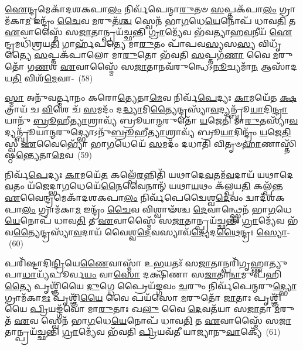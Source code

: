 {\anuvakamend[{\-\ul{𑌰𑍁}\-𑌦𑍍𑌰𑍋 𑌭𑍇᳴\-\ul{𑌷}\-𑌜𑌂 \ul{𑌵𑌿}\-𑌨𑍍𑌦\-\ul{𑌤𑍇} 𑌯𑌦𑌿᳴ 𑌸𑍍𑌤𑍃\-\ul{𑌣𑍀}\-𑌯𑌾\-\ul{𑌦}\-𑌰𑍍𑌦𑍍𑌧𑌂 𑌦𑍍𑌵𑌾𑌦᳴𑌶 𑌚}]}

\-\ul{𑌐}\-𑌨𑍍𑌦𑍍𑌰𑌮𑍇𑌕𑌾᳴\-𑌦𑌶\-𑌕𑌪𑌾\-\ul{𑌲𑌂} 𑌨𑌿𑌰𑍍𑌵᳴𑌪𑍇𑌨𑍍𑌮𑌾\-\ul{𑌰𑍁}\-𑌤𑍞 \ul{𑌸}\-𑌪𑍍𑌤𑌕᳴𑌪𑌾\-\ul{𑌲𑌂} 𑌗𑍍𑌰𑌾𑌮᳴𑌕𑌾\-\ul{𑌮} 𑌇𑌨𑍍𑌦𑍍𑌰𑌂᳴ \ul{𑌚𑍈}\-𑌵 \ul{𑌮}\-𑌰𑍁𑌤᳴\-\ul{𑌶𑍍𑌚} 𑌸𑍍𑌵𑍇𑌨᳴ 𑌭𑌾\-\ul{𑌗}\-𑌧𑍇\-\ul{𑌯𑍇}\-𑌨𑍋𑌪᳴ 𑌧𑌾𑌵\-\ul{𑌤𑌿} 𑌤 \ul{𑌏}\-𑌵𑌾𑌸𑍍𑌮𑍈᳴ 𑌸\-\ul{𑌜𑌾}\-𑌤𑌾𑌨𑍍𑌪𑍍𑌰𑌯᳴𑌚𑍍𑌛𑌨𑍍𑌤𑌿 \ul{𑌗𑍍𑌰𑌾}\-𑌮𑍍𑌯𑍇᳴𑌵 𑌭᳴𑌵𑌤𑍍𑌯𑌾𑌹\-\ul{𑌵}\-𑌨𑍀𑌯᳴ \ul{𑌐}\-𑌨𑍍𑌦𑍍𑌰𑌮𑌧𑌿᳴𑌶𑍍𑌰𑌯\-\ul{𑌤𑌿} 𑌗𑌾𑌰𑍍\mbox{}𑌹᳴𑌪𑌤𑍍𑌯𑍇 𑌮𑌾\-\ul{𑌰𑍁}\-𑌤𑌂 𑌪𑌾᳴𑌪𑌵\-\ul{𑌸𑍍𑌯}\-𑌸\-\ul{𑌸𑍍𑌯} 𑌵𑌿𑌧𑍃᳴𑌤𑍍𑌯𑍈 \ul{𑌸}\-𑌪𑍍𑌤𑌕᳴𑌪𑌾𑌲𑍋 𑌮𑌾\-\ul{𑌰𑍁}\-𑌤𑍋 𑌭᳴𑌵𑌤𑌿 \ul{𑌸}\-𑌪𑍍𑌤𑌗᳴\-\ul{𑌣𑌾} 𑌵𑍈 \ul{𑌮}\-𑌰𑍁𑌤𑍋᳴ 𑌗\-\ul{𑌣}\-𑌶 \ul{𑌏}\-𑌵𑌾𑌸𑍍𑌮𑍈᳴ 𑌸\-\ul{𑌜𑌾}\-𑌤𑌾𑌨𑌵᳴\-𑌰𑍁𑌨𑍍𑌧𑍇\-𑌽\-\ul{𑌨𑍂}\-𑌚𑍍𑌯𑌮𑌾᳴\-\ul{𑌨} 𑌆𑌸𑌾᳴𑌦𑌯\-\ul{𑌤𑌿} 𑌵𑌿𑌶᳴\-\ul{𑌮𑍇}\-𑌵𑌾-~(58)

\-\ul{𑌸𑍍𑌮𑌾} 𑌅𑌨𑍁᳴𑌵𑌰𑍍𑌤𑍍𑌮𑌾𑌨𑌂 𑌕𑌰𑍋\-\ul{𑌤𑍍𑌯𑍇}\-𑌤𑌾\-\ul{𑌮𑍇}\-𑌵 𑌨𑌿𑌰𑍍𑌵᳴\-\ul{𑌪𑍇}\-𑌦𑍍𑌯𑌃 \ul{𑌕𑌾}\-𑌮𑌯𑍇᳴𑌤 \ul{𑌕𑍍𑌷}\-𑌤𑍍𑌰𑌾𑌯᳴ 𑌚 \ul{𑌵𑌿}\-𑌶𑍇 𑌚᳴ \ul{𑌸}\-𑌮𑌦𑌂᳴ 𑌦\-\ul{𑌦𑍍𑌧𑍍𑌯𑌾}\-𑌮𑌿\-\ul{𑌤𑍍𑌯𑍈}\-𑌨𑍍𑌦𑍍𑌰𑌸𑍍𑌯𑌾᳴\-\ul{𑌵}\-𑌦𑍍𑌯𑌨𑍍𑌬𑍍𑌰𑍂᳴\-\ul{𑌯𑌾}\-𑌦𑌿\-\ul{𑌨𑍍𑌦𑍍𑌰𑌾}\-𑌯𑌾𑌨𑍁᳴ \ul{𑌬𑍍𑌰𑍂}\-𑌹𑍀\-\ul{𑌤𑍍𑌯𑌾}\-𑌶𑍍𑌰𑌾𑌵𑍍𑌯᳴ 𑌬𑍍𑌰𑍂𑌯𑌾\-\ul{𑌨𑍍𑌮}\-𑌰𑍁𑌤𑍋᳴ \ul{𑌯}\-𑌜𑍇𑌤𑌿᳴ 𑌮𑌾\-\ul{𑌰𑍁}\-𑌤𑌸𑍍𑌯𑌾᳴\-\ul{𑌵}\-𑌦𑍍𑌯𑌨𑍍𑌬𑍍𑌰𑍂᳴𑌯𑌾\-\ul{𑌨𑍍𑌮}\-𑌰𑍁𑌦𑍍𑌭𑍍𑌯𑍋\-𑌽𑌨𑍁᳴\-\ul{𑌬𑍍𑌰𑍂}\-𑌹𑍀\-\ul{𑌤𑍍𑌯𑌾}\-𑌶𑍍𑌰𑌾𑌵𑍍𑌯᳴ 𑌬𑍍𑌰𑍂\-\ul{𑌯𑌾}\-𑌦𑌿𑌨𑍍𑌦𑍍𑌰𑌂᳴ \ul{𑌯}\-𑌜𑍇\-\ul{𑌤𑌿} 𑌸𑍍𑌵 \ul{𑌏}\-𑌵𑍈𑌭𑍍𑌯𑍋᳴ 𑌭𑌾\-\ul{𑌗}\-𑌧𑍇𑌯𑍇᳴ \ul{𑌸}\-𑌮𑌦𑌂᳴ 𑌦𑌧𑌾𑌤𑌿 𑌵𑌿𑌤𑍃𑍞\-\ul{𑌹𑌾}\-𑌣𑌾𑌸𑍍𑌤𑌿᳴𑌷𑍍𑌠\-\ul{𑌨𑍍𑌤𑍍𑌯𑍇}\-𑌤𑌾\-\ul{𑌮𑍇}\-𑌵~(59)

𑌨𑌿𑌰𑍍𑌵᳴\-\ul{𑌪𑍇}\-𑌦𑍍𑌯𑌃 \ul{𑌕𑌾}\-𑌮𑌯𑍇᳴\-\ul{𑌤} 𑌕𑌲𑍍𑌪𑍇᳴\-\ul{𑌰}\-𑌨𑍍𑌨𑌿𑌤𑌿᳴ 𑌯𑌥𑌾𑌦𑍇\-\ul{𑌵}\-𑌤𑌮᳴\-\ul{𑌵}\-𑌦𑌾𑌯᳴ 𑌯𑌥𑌾𑌦𑍇\-\ul{𑌵}\-𑌤𑌂 𑌯᳴𑌜𑍇𑌦𑍍𑌭𑌾\-\ul{𑌗}\-𑌧𑍇𑌯𑍇᳴\-\ul{𑌨𑍈}\-𑌵𑍈𑌨𑌾𑌨𑍍᳴ 𑌯𑌥𑌾\-\ul{𑌯}\-𑌥𑌂 𑌕᳴𑌲𑍍𑌪𑌯\-\ul{𑌤𑌿} 𑌕𑌲𑍍𑌪᳴𑌨𑍍𑌤 \ul{𑌏}\-𑌵𑍈𑌨𑍍𑌦𑍍𑌰𑌮𑍇𑌕𑌾᳴\-𑌦𑌶\-𑌕𑌪𑌾\-\ul{𑌲𑌂} 𑌨𑌿𑌰𑍍𑌵᳴𑌪𑍇𑌦𑍍𑌵𑍈𑌶𑍍𑌵\-\ul{𑌦𑍇}\-𑌵𑌂 𑌦𑍍𑌵𑌾𑌦᳴𑌶\-𑌕𑌪𑌾\-\ul{𑌲𑌂} 𑌗𑍍𑌰𑌾𑌮᳴𑌕𑌾\-\ul{𑌮} 𑌇𑌨𑍍𑌦𑍍𑌰𑌂᳴ \ul{𑌚𑍈}\-𑌵 𑌵𑌿𑌶𑍍𑌵𑌾𑍟᳴𑌶𑍍𑌚 \ul{𑌦𑍇}\-𑌵𑌾𑌨𑍍𑌥𑍍𑌸𑍍𑌵𑍇𑌨᳴ 𑌭𑌾\-\ul{𑌗}\-𑌧𑍇\-\ul{𑌯𑍇}\-𑌨𑍋𑌪᳴ 𑌧𑌾𑌵\-\ul{𑌤𑌿} 𑌤 \ul{𑌏}\-𑌵𑌾𑌸𑍍𑌮𑍈᳴ 𑌸\-\ul{𑌜𑌾}\-𑌤𑌾𑌨𑍍𑌪𑍍𑌰𑌯᳴𑌚𑍍𑌛𑌨𑍍𑌤𑌿 \ul{𑌗𑍍𑌰𑌾}\-𑌮𑍍𑌯𑍇᳴𑌵 𑌭᳴𑌵\-\ul{𑌤𑍍𑌯𑍈}\-𑌨𑍍𑌦𑍍𑌰𑌸𑍍𑌯𑌾᳴\-\ul{𑌵}\-𑌦𑌾𑌯᳴ 𑌵𑍈𑌶𑍍𑌵\-\ul{𑌦𑍇}\-𑌵𑌸𑍍𑌯𑌾𑌵᳴\-\ul{𑌦𑍍𑌯𑍇}\-𑌦\-\ul{𑌥𑍈}\-𑌨𑍍𑌦𑍍𑌰𑌃 \ul{𑌸𑍍𑌯𑍋}\--~(60)

𑌪𑌰𑌿᳴𑌷𑍍𑌟𑌾𑌦𑌿\-\ul{𑌨𑍍𑌦𑍍𑌰𑌿}\-𑌯𑍇\-\ul{𑌣𑍈}\-𑌵𑌾𑌸𑍍𑌮𑌾᳴ 𑌉\-\ul{𑌭}\-𑌯𑌤𑌃᳴ 𑌸\-\ul{𑌜𑌾}\-𑌤𑌾𑌨𑍍𑌪𑌰𑌿᳴\-𑌗𑍃𑌹𑍍𑌣𑌾𑌤𑍍𑌯𑍁𑌪𑌾\-\ul{𑌧𑌾}\-𑌯𑍍𑌯᳴𑌪𑍂𑌰𑍍𑌵\-\ul{𑌯𑌂} 𑌵𑌾\-\ul{𑌸𑍋} 𑌦𑌕𑍍𑌷𑌿᳴𑌣𑌾 𑌸\-\ul{𑌜𑌾}\-𑌤𑌾\-\ul{𑌨𑌾}\-𑌮𑍁𑌪᳴𑌹𑌿\-\ul{𑌤𑍍𑌯𑍈} 𑌪𑍃𑌶𑍍𑌞𑌿᳴𑌯𑍈 \ul{𑌦𑍁}\-𑌗𑍍𑌧𑍇 𑌪𑍍𑌰𑍈𑌯᳴𑌙𑍍𑌗𑌵𑌂 \ul{𑌚}\-𑌰𑍁𑌂 𑌨𑌿𑌰𑍍𑌵᳴𑌪𑍇\-\ul{𑌨𑍍𑌮}\-𑌰𑍁\-\ul{𑌦𑍍𑌭𑍍𑌯𑍋} 𑌗𑍍𑌰𑌾𑌮᳴𑌕𑌾\-\ul{𑌮𑌃} 𑌪𑍃𑌶𑍍𑌞𑌿᳴\-\ul{𑌯𑍈} 𑌵𑍈 𑌪𑌯᳴𑌸𑍋 \ul{𑌮}\-𑌰𑍁𑌤𑍋᳴ \ul{𑌜𑌾}\-𑌤𑌾𑌃 𑌪𑍃𑌶𑍍𑌞𑌿᳴𑌯𑍈 \ul{𑌪𑍍𑌰𑌿}\-𑌯𑌙𑍍𑌗᳴𑌵𑍋 𑌮𑌾\-\ul{𑌰𑍁}\-𑌤𑌾𑌃 𑌖\-\ul{𑌲𑍁} 𑌵𑍈 \ul{𑌦𑍇}\-𑌵𑌤᳴𑌯𑌾 𑌸\-\ul{𑌜𑌾}\-𑌤𑌾 \ul{𑌮}\-𑌰𑍁𑌤᳴ \ul{𑌏}\-𑌵 𑌸𑍍𑌵𑍇𑌨᳴ 𑌭𑌾\-\ul{𑌗}\-𑌧𑍇\-\ul{𑌯𑍇}\-𑌨𑍋𑌪᳴ 𑌧𑌾𑌵\-\ul{𑌤𑌿} 𑌤 \ul{𑌏}\-𑌵𑌾𑌸𑍍𑌮𑍈᳴ 𑌸\-\ul{𑌜𑌾}\-𑌤𑌾𑌨𑍍𑌪𑍍𑌰𑌯᳴𑌚𑍍𑌛𑌨𑍍𑌤𑌿 \ul{𑌗𑍍𑌰𑌾}\-𑌮𑍍𑌯𑍇᳴𑌵 𑌭᳴𑌵𑌤𑌿 \ul{𑌪𑍍𑌰𑌿}\-𑌯𑌵᳴𑌤𑍀 𑌯𑌾𑌜𑍍𑌯𑌾𑌨𑍁\-\ul{𑌵𑌾}\-𑌕𑍍𑌯𑍇᳴~(61)

